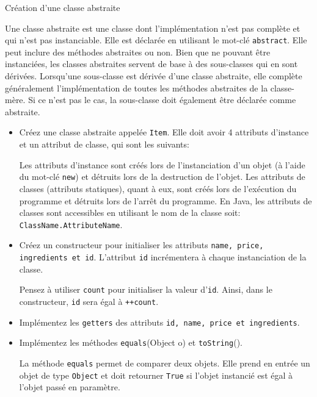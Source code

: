 \begin{Exercice}[15 minutes]{Création d'une classe abstraite}

	Une classe abstraite est une classe dont l'implémentation n'est pas complète et qui n'est pas instanciable. Elle est déclarée en utilisant le mot-clé \lstinline{abstract}. Elle peut inclure des méthodes abstraites ou non. Bien que ne pouvant être instanciées, les classes abstraites servent de base à des sous-classes qui en sont dérivées.
	Lorsqu'une sous-classe est dérivée d'une classe abstraite, elle complète généralement l'implémentation de toutes les méthodes abstraites de la classe-mère. Si ce n'est pas le cas, la sous-classe doit également être déclarée comme abstraite.
	
	 
	
	\begin{itemize}
		\item Créez une classe abstraite appelée \lstinline{Item}. Elle doit avoir 4 attributs d'instance et un attribut de classe, qui sont les suivants:
		 
		\begin{conseil}
			Les attributs d'instance sont créés lors de l'instanciation d'un objet (à l'aide du mot-clé \lstinline{new}) et détruits lors de la destruction de l'objet. Les attributs de classes (attributs statiques), quant à eux, sont créés lors de l'exécution du programme et détruits lors de l'arrêt du programme. En Java, les attributs de classes sont accessibles en utilisant le nom de la classe soit: \lstinline{ClassName.AttributeName}.
		\end{conseil}
		\item Créez un constructeur pour initialiser les attributs \lstinline{name, price, ingredients et id}. L'attribut \lstinline{id} incrémentera à chaque instanciation de la classe.
		\begin{conseil}
			Pensez à utiliser \lstinline{count} pour initialiser la valeur d'\lstinline{id}. Ainsi, dans le constructeur, \lstinline{id} sera égal à \lstinline{++count}.
		\end{conseil}
		\item Implémentez les \lstinline{getters} des attributs \lstinline{id, name, price et ingredients}.
		\item Implémentez les méthodes \lstinline{equals}(Object o) et \lstinline{toString}().
	
	\begin{conseil}
	La méthode \lstinline{equals} permet de comparer deux objets. Elle prend en entrée un objet de type \lstinline{Object} et doit retourner \lstinline{True} si l'objet instancié est égal à l'objet passé en paramètre.
	\end{conseil}
\end{itemize}
		\begin{solution}  
			 
		\end{solution}
	\end{Exercice}
	

